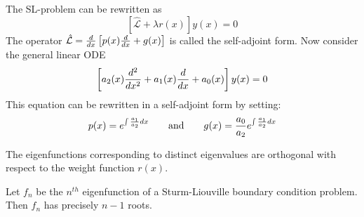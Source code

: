     \begin{definition}
		The SL-problem can be rewritten as \[\left[\hat{\mathcal{L}} + \lambda r(x)\right]y(x) = 0\]The operator $\hat{\mathcal{L}} = \frac{d}{dx}\left[p(x)\frac{d}{dx} + g(x)\right]$ is called the self-adjoint form. Now consider the general linear ODE
        \begin{equation}
			\left[a_2(x)\frac{d^{2} }{d x ^{2}} + a_1(x)\frac{d}{dx} + a_0(x)\right]y(x) = 0
		\end{equation}
        This equation can be rewritten in a self-adjoint form by setting:
        \begin{equation}
			p(x) = e^{\int\frac{a_1}{a_2}dx}\qquad\text{and}\qquad g(x) = \stylefrac{a_0}{a_2}e^{\int\frac{a_1}{a_2}dx}
		\end{equation}
	\end{definition}
    
    \begin{property}
		The eigenfunctions corresponding to distinct eigenvalues are orthogonal with respect to the weight function $r(x)$.
	\end{property}

	\begin{theorem}
		Let $f_n$ be the $n^{th}$ eigenfunction of a Sturm-\newline Liouville boundary condition problem. Then $f_n$ has precisely $n-1$ roots.
	\end{theorem}
